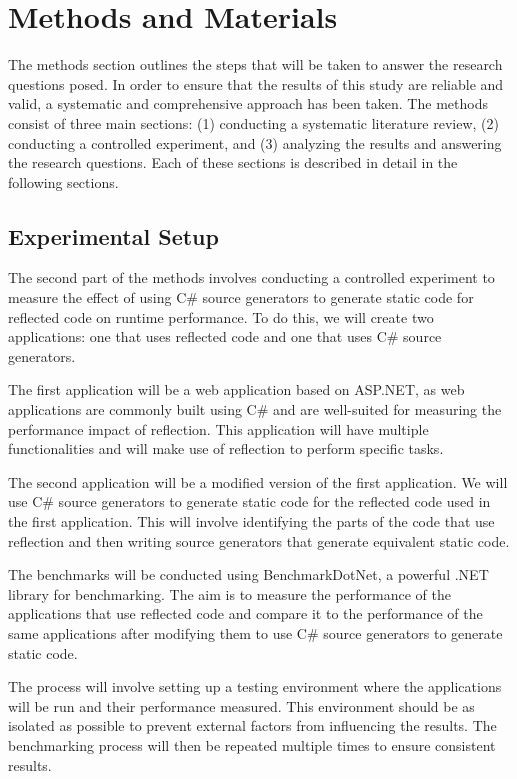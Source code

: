 \chapter{Methods and Materials}

The methods section outlines the steps that will be taken to answer the research questions posed. In order to ensure that the results of this study are reliable and valid, a systematic and comprehensive approach has been taken. The methods consist of three main sections: (1) conducting a systematic literature review, (2) conducting a controlled experiment, and (3) analyzing the results and answering the research questions. Each of these sections is described in detail in the following sections.

\section{Experimental Setup}

The second part of the methods involves conducting a controlled experiment to measure the effect of using C\# source generators to generate static code for reflected code on runtime performance. To do this, we will create two applications: one that uses reflected code and one that uses C\# source generators.

The first application will be a web application based on ASP.NET, as web applications are commonly built using C\# and are well-suited for measuring the performance impact of reflection. This application will have multiple functionalities and will make use of reflection to perform specific tasks.

The second application will be a modified version of the first application. We will use C\# source generators to generate static code for the reflected code used in the first application. This will involve identifying the parts of the code that use reflection and then writing source generators that generate equivalent static code.

The benchmarks will be conducted using BenchmarkDotNet, a powerful .NET library for benchmarking. The aim is to measure the performance of the applications that use reflected code and compare it to the performance of the same applications after modifying them to use C\# source generators to generate static code.

The process will involve setting up a testing environment where the applications will be run and their performance measured. This environment should be as isolated as possible to prevent external factors from influencing the results. The benchmarking process will then be repeated multiple times to ensure consistent results.

